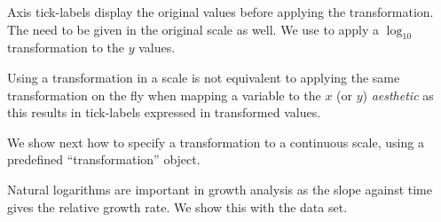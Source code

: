 \documentclass[krantz2]{krantz}\usepackage{knitr}
\begin{document}
Axis tick-labels display the original values before applying the transformation. The  need to be given in the original scale as well. We use  to apply a $\log_{10}$ transformation to the $y$ values.

\begin{knitrout}\footnotesize
{}\color{fgcolor}\begin{kframe}
\begin{alltt}
  \hlstd{(}\hlstd{=}\hlstd{(}\hlstd{,}\hlstd{,}\hlstd{,}\hlstd{))}
\end{alltt}
\end{kframe}
\end{knitrout}

Using a transformation in a scale is not equivalent to applying the same transformation on the fly when mapping a variable to the $x$  (or $y$) \emph{aesthetic} as this results in tick-labels expressed in transformed values.

\begin{knitrout}\footnotesize
{}\color{fgcolor}\begin{kframe}
\begin{alltt}
   \hlopt{+}
  \hlstd{()}
\end{alltt}
\end{kframe}
\end{knitrout}

We show next how to specify a transformation to a continuous scale, using a predefined ``transformation'' object.

\begin{knitrout}\footnotesize
{}\color{fgcolor}\begin{kframe}
\begin{alltt}
  \hlstd{(} \hlstd{=} \hlstd{)}
\end{alltt}
\end{kframe}
\end{knitrout}

Natural logarithms are important in growth analysis as the slope against time gives the relative growth rate. We show this with the  data set.
\end{document}
